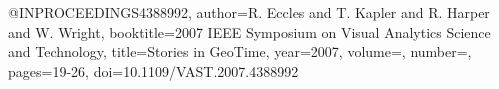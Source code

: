 @INPROCEEDINGS{4388992,
  author={R. {Eccles} and T. {Kapler} and R. {Harper} and W. {Wright}},
  booktitle={2007 IEEE Symposium on Visual Analytics Science and Technology}, 
  title={Stories in GeoTime}, 
  year={2007},
  volume={},
  number={},
  pages={19-26},
  doi={10.1109/VAST.2007.4388992}}